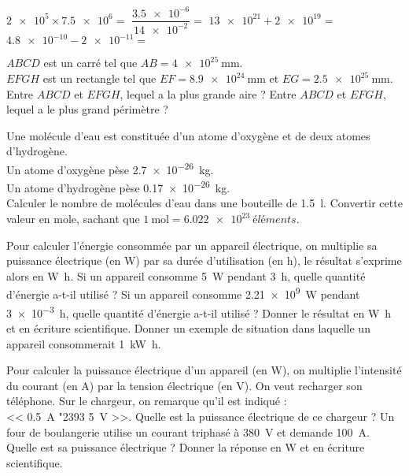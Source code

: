 \documentclass[../Cours.tex]{subfiles}
\begin{document}
\begin{questions}
    \vspace{-1.5em}
        \begin{multicols}{2}
            \question $\num{2e5} \times \num{7.5e6} = $
            \question $\dfrac{\num{3.5e-6}}{\num{14e-2}} = $
            \question $\num{13e21} + \num{2e19} = $
            \question $\num{4.8e-10} - \num{2e-11} = $
        \end{multicols}

    \exercice
        $ABCD$ est un carré tel que $AB = \qty{4e25}{\milli\metre}$.\\
        $EFGH$ est un rectangle tel que $EF = \qty{8,9e24}{\milli\metre}$ et $EG = \qty{2,5e25}{\milli\metre}$.
        \question Entre $ABCD$ et $EFGH$, lequel a la plus grande aire ?
        \question Entre $ABCD$ et $EFGH$, lequel a le plus grand périmètre ?

        Une molécule d'eau est constituée d'un atome d'oxygène et de deux atomes d'hydrogène.\\
        Un atome d'oxygène pèse \qty{2.7e-26}{kg}.\\
        Un atome d'hydrogène pèse \qty{0.17e-26}{kg}.\\
        \question Calculer le nombre de molécules d'eau dans une bouteille de \qty{1.5}{\litre}.
        \question Convertir cette valeur en mole, sachant que $\qty{1}{\mol} = \qty{6.022e23}{éléments}$. 

    \clearpage
        \question Pour calculer l'énergie consommée par un appareil électrique, on multiplie sa puissance électrique (en \unit{\watt}) par sa durée d'utilisation (en \unit{\hour}), le résultat s'exprime alors en \unit{\watt\hour}.
            \subquestion Si un appareil consomme \qty{5}{\watt} pendant \qty{3}{\hour}, quelle quantité d'énergie a-t-il utilisé ?
            \subquestion Si un appareil consomme \qty{2.21e9}{\watt} pendant \qty{3e-3}{\hour}, quelle quantité d'énergie a-t-il utilisé ? Donner le résultat en \unit{\watt\hour} et en écriture scientifique.
            \subquestion Donner un exemple de situation dans laquelle un appareil consommerait \qty{1}{\kilo\watt\hour}.

        \vspace{1em}
        \question Pour calculer la puissance électrique d'un appareil (en \unit{\watt}), on multiplie l'intensité du courant (en \unit{\ampere}) par la tension électrique (en \unit{\volt}).
            \subquestion On veut recharger son téléphone. Sur le chargeur, on remarque qu'il est indiqué : \\<< \qty{0.5}{\ampere} \char"2393 \qty{5}{\volt} >>. Quelle est la puissance électrique de ce chargeur ?
            \subquestion Un four de boulangerie utilise un courant triphasé à \qty{380}{\volt} et demande \qty{100}{\ampere}. Quelle est sa puissance électrique ? Donner la réponse en \unit{\watt} et en écriture scientifique.


\end{questions}
\end{document}
